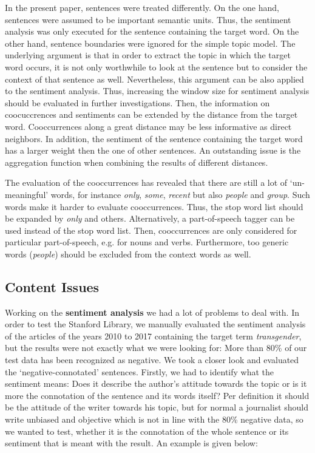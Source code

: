 \documentclass[10pt,a4paper,twocolumn]{scrartcl}
\begin{document}
In the present paper, sentences were treated differently. On the one hand, sentences were assumed to be important semantic units. Thus, the sentiment analysis was only executed for the sentence containing the target word. On the other hand, sentence boundaries were ignored for the simple topic model. The underlying argument is that in order to extract the topic in which the target word occurs, it is not only worthwhile to look at the sentence but to consider the context of that sentence as well. Nevertheless, this argument can be also applied to the sentiment analysis. Thus, increasing the window size for sentiment analysis should be evaluated in further investigations. Then, the information on coocuccrences and sentiments can be extended by the distance from the target word. Cooccurrences along a great distance may be less informative as direct neighbors. In addition, the sentiment of the sentence containing the target word has a larger weight then the one of other sentences. An outstanding issue is the aggregation function when combining the results of different distances.

The evaluation of the cooccurrences has revealed that there are still a lot of `un-meaningful' words, for instance \textit{only}, \textit{some}, \textit{recent} but also \textit{people} and \textit{group}. Such words make it harder to evaluate cooccurrences. Thus, the stop word list should be expanded by \textit{only} and others. Alternatively, a part-of-speech tagger can be used instead of the stop word list. Then, cooccurrences are only considered for particular part-of-speech, e.g. for nouns and verbs. Furthermore, too generic words (\textit{people}) should be excluded from the context words as well. 


\subsection{Content Issues}\label{subsex:contentIssues}
Working on the \textbf{sentiment analysis} we had a lot of problems to deal with. In order to test the Stanford Library, we manually evaluated the sentiment analysis of the articles of the years 2010 to 2017 containing the target term \textit{transgender}, but the results were not exactly what we were looking for: More than 80\% of our test data has been recognized as negative. We took a closer look and evaluated the `negative-connotated' sentences. Firstly, we had to identify what the sentiment means: Does it describe the author's attitude towards the topic or is it more the connotation of the sentence and its words itself? Per definition it should be the attitude of the writer towards his topic, but for normal a journalist should write unbiased and objective which is not in line with the 80\% negative data, so we wanted to test, whether it is the connotation of the whole sentence or its sentiment that is meant with the result. An example is given below:
\end{document}
